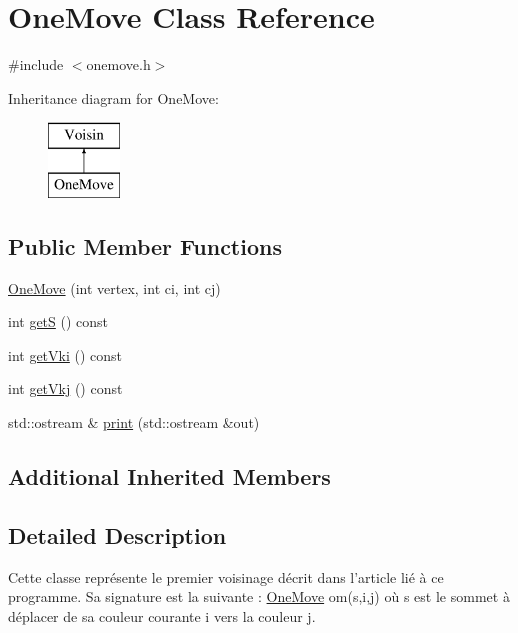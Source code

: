 \hypertarget{classOneMove}{\section{One\-Move Class Reference}
\label{classOneMove}
}


{\ttfamily \#include $<$onemove.\-h$>$}

Inheritance diagram for One\-Move\-:\begin{figure}[H]
\begin{center}
\leavevmode
\includegraphics[height=2.000000cm]{classOneMove}
\end{center}
\end{figure}
\subsection*{Public Member Functions}
\begin{DoxyCompactItemize}
\item 
\hyperlink{classOneMove_a541f07108dca35fc6b352def2a040f26}{One\-Move} (int vertex, int ci, int cj)
\item 
int \hyperlink{classOneMove_a2fc5090fc05acec17a3ef1e30876e2b8}{get\-S} () const 
\item 
int \hyperlink{classOneMove_ad1224f9cdfb286dffee7a139a76a9642}{get\-Vki} () const 
\item 
int \hyperlink{classOneMove_a2b68813d5e5dd6bf3dd6d60bbb3ae5c5}{get\-Vkj} () const 
\item 
std\-::ostream \& \hyperlink{classOneMove_a14bbd56811a5863154f037e18c2d12e0}{print} (std\-::ostream \&out)
\end{DoxyCompactItemize}
\subsection*{Additional Inherited Members}


\subsection{Detailed Description}
Cette classe représente le premier voisinage décrit dans l'article lié à ce programme. Sa signature est la suivante \-: \hyperlink{classOneMove}{One\-Move} om(s,i,j) où s est le sommet à déplacer de sa couleur courante i vers la couleur j. 

